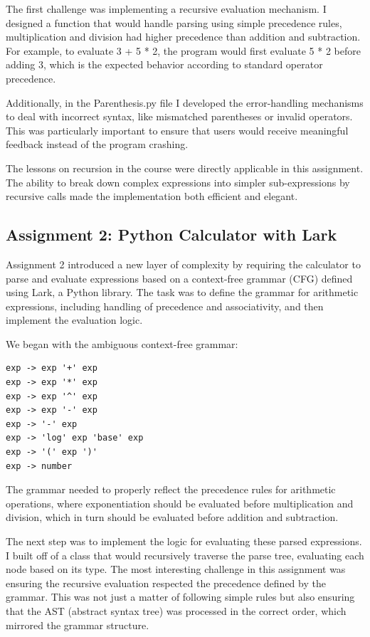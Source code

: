 \documentclass{article}
\theoremstyle{theorem}
\theoremstyle{definition}
\theoremstyle{remark}
\begin{document}
The first challenge was implementing a recursive evaluation mechanism. I designed a 
function that would handle parsing using simple precedence rules, multiplication and 
division had higher precedence than addition and subtraction. For example, to evaluate 
3 + 5 * 2, the program would first evaluate 5 * 2 before adding 3, which is the 
expected behavior according to standard operator precedence.

Additionally, in the Parenthesis.py file I developed the error-handling mechanisms 
to deal with incorrect syntax, like mismatched parentheses or invalid operators. 
This was particularly important to ensure that users would receive meaningful 
feedback instead of the program crashing.

The lessons on recursion in the course were directly applicable in this assignment. 
The ability to break down complex expressions into simpler sub-expressions by 
recursive calls made the implementation both efficient and elegant.
\subsection*{Assignment 2: Python Calculator with Lark}
Assignment 2 introduced a new layer of complexity by requiring the calculator to 
parse and evaluate expressions based on a context-free grammar (CFG) defined using 
Lark, a Python library. The task was to define the grammar for arithmetic expressions,
including handling of precedence and associativity, and then implement the evaluation logic.

We began with the ambiguous context-free grammar:
\begin{verbatim}
exp -> exp '+' exp
exp -> exp '*' exp
exp -> exp '^' exp
exp -> exp '-' exp
exp -> '-' exp 
exp -> 'log' exp 'base' exp
exp -> '(' exp ')'
exp -> number
\end{verbatim}
The grammar needed to properly reflect the precedence rules for arithmetic operations, where 
exponentiation should be evaluated before multiplication and division, which in turn should 
be evaluated before addition and subtraction.

The next step was to implement the logic for evaluating these parsed expressions. I built off of a 
class that would recursively traverse the parse tree, evaluating each node based on its type. 
The most interesting challenge in this assignment was ensuring the recursive evaluation respected 
the precedence defined by the grammar. This was not just a matter of following simple rules but also 
ensuring that the AST (abstract syntax tree) was processed in the correct order, which mirrored the 
grammar structure.
\end{document}
